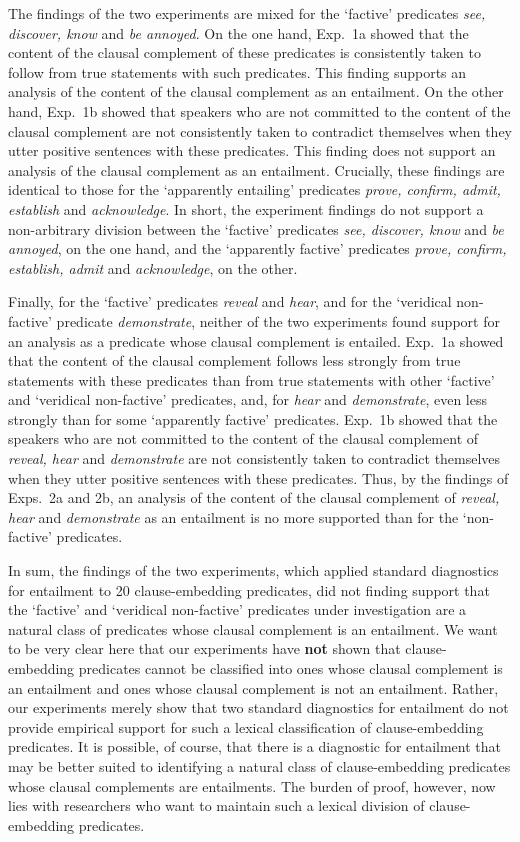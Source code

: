 \documentclass[11pt,fleqn]{article}
\newcommand{\6}{\mbox{$[\hspace*{-.6mm}[$}}
\newcommand{\9}{\mbox{$]\hspace*{-.6mm}]$}}
\begin{document}
{The findings of the two experiments are mixed for the `factive' predicates {\em see, discover, know} and {\em be annoyed}. On the one hand, Exp.~1a showed that the content of the clausal complement of these predicates is consistently taken to follow from true statements with such predicates. This finding supports an analysis of the content of the clausal complement as an entailment. On the other hand, Exp.~1b showed that speakers who are not committed to the content of the clausal complement are not consistently taken to contradict themselves when they utter positive sentences with these predicates. This finding does not support an analysis of the clausal complement as an entailment. Crucially, these findings are identical to those for the `apparently entailing' predicates {\em prove, confirm, admit, establish} and {\em acknowledge}. In short, the experiment findings do not support a non-arbitrary division between the  `factive' predicates {\em see, discover, know} and {\em be annoyed}, on the one hand, and the `apparently factive' predicates {\em prove, confirm, establish, admit} and {\em acknowledge}, on the other.

Finally, for the `factive' predicates {\em reveal} and {\em hear}, and for the `veridical non-factive' predicate {\em demonstrate}, neither of the two experiments found support for an analysis as a predicate whose clausal complement is entailed. Exp.~1a showed that the content of the clausal complement follows less strongly from true statements with these predicates than from true statements with other `factive' and `veridical non-factive' predicates, and, for {\em hear} and {\em demonstrate}, even less strongly than for some `apparently factive' predicates. Exp.~1b showed that the speakers who are not committed to the content of the clausal complement  of {\em reveal, hear} and {\em demonstrate} are not consistently taken to contradict themselves when they utter positive sentences with these predicates. Thus, by the findings of Exps.~2a and 2b, an analysis of the content of the clausal complement of {\em reveal, hear} and {\em demonstrate} as an entailment is no more supported than for the `non-factive' predicates. 

In sum, the findings of the two experiments, which applied standard diagnostics for entailment to 20 clause-embedding predicates, did not finding support that the `factive' and `veridical non-factive' predicates under investigation are a natural class of predicates whose clausal complement is an entailment. We want to be very clear here that our experiments have {\bf not} shown that clause-embedding predicates cannot be classified into ones whose clausal complement is an entailment and ones whose clausal complement is not an entailment. Rather, our experiments merely show that two standard diagnostics for entailment do not provide empirical support for such a lexical classification of clause-embedding predicates. It is possible, of course, that there is a diagnostic for entailment that may be better suited to identifying a natural class of clause-embedding predicates whose clausal complements are entailments. The burden of proof, however, now lies with researchers who want to maintain such a lexical division of clause-embedding predicates. 

}
\end{document}
